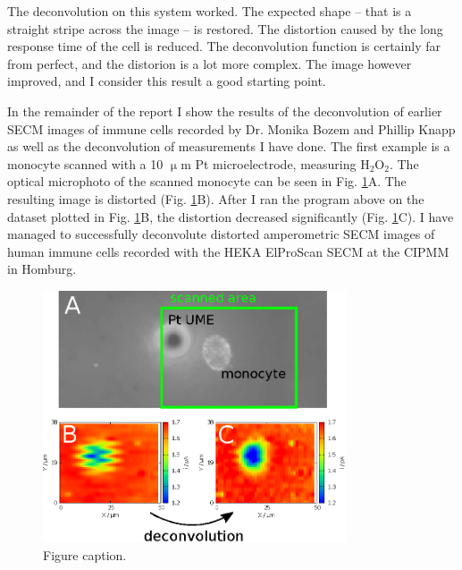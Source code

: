 \documentclass[a4paper, 11pt, oneside, bibliography=totoc]{article}
\begin{document}
The deconvolution on this system worked. The expected shape -- that is a straight stripe across the image -- is restored. The distortion caused by the long response time of the cell is reduced. The deconvolution function is certainly far from perfect, and the distorion is a lot more complex. The image however improved, and I consider this result a good starting point. 

In the remainder of the report I show the results of the deconvolution of earlier SECM images of immune cells recorded by Dr. Monika Bozem and Phillip Knapp as well as the deconvolution of measurements I have done. The first example is a monocyte scanned with a 10 $\upmu$m Pt microelectrode, measuring H$_2$O$_2$. The optical microphoto of the scanned monocyte can be seen in Fig. \ref{fig:deconv}A. The resulting image is distorted (Fig. \ref{fig:deconv}B). After I ran the program above on the dataset plotted in Fig. \ref{fig:deconv}B, the distortion decreased significantly (Fig. \ref{fig:deconv}C). I have managed to successfully deconvolute distorted amperometric SECM images of human immune cells recorded with the HEKA ElProScan SECM at the CIPMM in Homburg.

\begin{figure}
\centering
\includegraphics[width=0.8\textwidth]{deconv.eps}
\caption{Figure caption.}
\label{fig:deconv}
\end{figure} 
\end{document}

